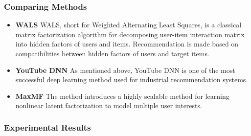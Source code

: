 \documentclass[sigconf]{acmart}
\begin{document}
\subsubsection{Comparing Methods}
\begin{itemize}
  \item\textbf{WALS} \cite{aberger2016recommender}
  WALS, short for Weighted Alternating Least Squares, is a classical matrix factorization algorithm for decomposing user-item interaction matrix into hidden factors of users and items.
  Recommendation is made based on compatibilities between hidden factors of users and target items.
  \item\textbf{YouTube DNN} \cite{covington2016deep}
  As mentioned above, YouTube DNN is one of the most successful deep learning method used for industrial recommendation systems.
  \item\textbf{MaxMF} \cite{weston2013nonlinear}
  The method introduces a highly scalable method for learning nonlinear latent factorization to model multiple user interests.
\end{itemize}


\subsubsection{Experimental Results}
\end{document}
